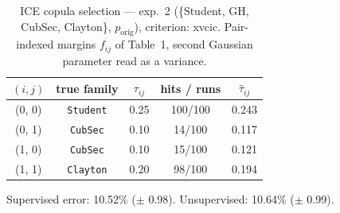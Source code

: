\begin{table}[htbp]
  \centering
  \caption{ICE copula selection — exp.\ 2 (\{Student, GH, CubSec, Clayton\}, $p_{\text{orig}}$), criterion: xvcic. Pair-indexed margins $f_{ij}$ of Table~1, second Gaussian parameter read as a variance.}
  \label{tab:exp3-exp2_orig_p__xvcic}
  \begin{tabular}{ccccc}
    \toprule
    $(i, j)$ & true family & $\tau_{ij}$ & hits / runs & $\hat\tau_{ij}$ \\
    \midrule
    (0, 0) & \texttt{Student} & 0.25 & 100/100 & 0.243 \\
    (0, 1) & \texttt{CubSec} & 0.10 & 14/100 & 0.117 \\
    (1, 0) & \texttt{CubSec} & 0.10 & 15/100 & 0.121 \\
    (1, 1) & \texttt{Clayton} & 0.20 & 98/100 & 0.194 \\
    \bottomrule
  \end{tabular}
  \par\smallskip Supervised error: 10.52\% ($\pm$ 0.98). Unsupervised: 10.64\% ($\pm$ 0.99).
\end{table}
